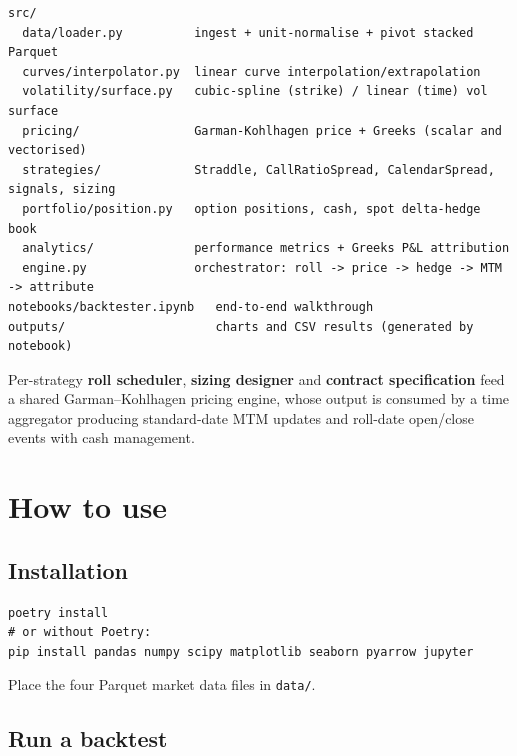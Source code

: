 \documentclass[11pt, a4paper]{article}
\theoremstyle{defstyle}
\newcommand{\code}[1]{\texttt{#1}}
\begin{document}
\begin{lstlisting}[style=bash, caption={Package layout}]
src/
  data/loader.py          ingest + unit-normalise + pivot stacked Parquet
  curves/interpolator.py  linear curve interpolation/extrapolation
  volatility/surface.py   cubic-spline (strike) / linear (time) vol surface
  pricing/                Garman-Kohlhagen price + Greeks (scalar and vectorised)
  strategies/             Straddle, CallRatioSpread, CalendarSpread, signals, sizing
  portfolio/position.py   option positions, cash, spot delta-hedge book
  analytics/              performance metrics + Greeks P&L attribution
  engine.py               orchestrator: roll -> price -> hedge -> MTM -> attribute
notebooks/backtester.ipynb   end-to-end walkthrough
outputs/                     charts and CSV results (generated by notebook)
\end{lstlisting}

Per-strategy \textbf{roll scheduler}, \textbf{sizing designer} and
\textbf{contract specification} feed a shared Garman--Kohlhagen pricing engine,
whose output is consumed by a time aggregator producing standard-date MTM updates
and roll-date open/close events with cash management.

\section{How to use}

\subsection{Installation}

\begin{lstlisting}[style=bash]
poetry install
# or without Poetry:
pip install pandas numpy scipy matplotlib seaborn pyarrow jupyter
\end{lstlisting}

Place the four Parquet market data files in \code{data/}.

\subsection{Run a backtest}
\end{document}
